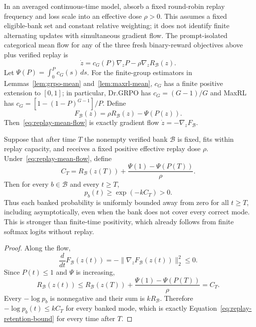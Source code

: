 In an averaged continuous-time model, absorb a fixed round-robin replay
frequency and loss scale into an effective dose $\rho>0$. This assumes a
fixed eligible-bank set and constant relative weighting; it does not identify
finite alternating updates with simultaneous gradient flow. The prompt-isolated categorical mean flow for any of the three fresh
binary-reward objectives above plus verified replay is
\begin{equation}
  \dot z
  =c_G(P)\nabla_zP-\rho\nabla_zR_{\mathcal B}(z).
  \label{eq:replay-mean-flow}
\end{equation}
Let $\Psi(P)=\int_0^P c_G(s)\,ds$. For the finite-group estimators in Lemmas~\ref{lem:grpo-mean}
and~\ref{lem:maxrl-mean}, $c_G$ has a finite positive extension to $[0,1]$;
in particular, Dr.GRPO has $c_G=(G-1)/G$ and MaxRL has
$c_G=[1-(1-P)^{G-1}]/P$. Define
\begin{equation}
  F_{\mathcal B}(z)=\rho R_{\mathcal B}(z)-\Psi(P(z)).
  \label{eq:replay-potential}
\end{equation}
Then~\eqref{eq:replay-mean-flow} is exactly gradient flow
$\dot z=-\nabla_zF_{\mathcal B}$.

\begin{theorem}
\label{thm:replay-retention}
Suppose that after time $T$ the nonempty verified bank $\mathcal B$ is fixed,
fits within replay capacity, and receives a fixed positive effective replay
dose $\rho$. Under~\eqref{eq:replay-mean-flow}, define
\[
  C_T
  =R_{\mathcal B}(z(T))
   +\frac{\Psi(1)-\Psi(P(T))}{\rho}.
\]
Then for every $b\in\mathcal B$ and every $t\ge T$,
\begin{equation}
  p_b(t)\ge \exp(-kC_T)>0.
  \label{eq:replay-retention-bound}
\end{equation}
Thus each banked probability is uniformly bounded away from zero for all
$t\ge T$, including asymptotically, even when the bank does not cover every
correct mode. This is stronger than finite-time positivity, which already
follows from finite softmax logits without replay.
\end{theorem}

\begin{proof}
Along the flow,
\[
  \frac{d}{dt}F_{\mathcal B}(z(t))
  =-\lVert\nabla_zF_{\mathcal B}(z(t))\rVert_2^2\le0.
\]
Since $P(t)\le1$ and $\Psi$ is increasing,
\[
  R_{\mathcal B}(z(t))
  \le R_{\mathcal B}(z(T))
     +\frac{\Psi(1)-\Psi(P(T))}{\rho}
  =C_T.
\]
Every $-\log p_b$ is nonnegative and their sum is
$kR_{\mathcal B}$. Therefore
$-\log p_b(t)\le kC_T$ for every banked mode, which is exactly
Equation~\eqref{eq:replay-retention-bound} for every time after $T$.
\end{proof}


